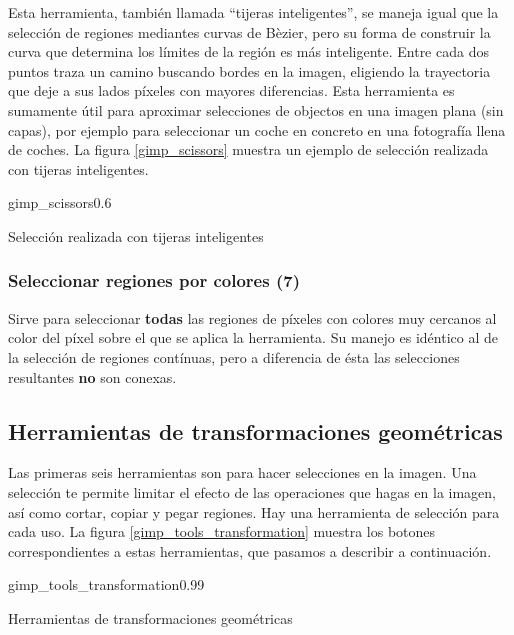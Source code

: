 Esta herramienta, también llamada  ``tijeras inteligentes'', se maneja
igual que la selección de regiones mediantes curvas de Bèzier, pero su
forma de construir la curva que  determina los límites de la región es
más inteligente. Entre cada dos  puntos \gimp traza un camino buscando
bordes en  la imagen, eligiendo  la trayectoria  que deje a  sus lados
píxeles con  mayores diferencias.  Esta herramienta es  sumamente útil
para  aproximar  selecciones de  objectos  en  una imagen  plana  (sin
capas),  por ejemplo  para seleccionar  un  coche en  concreto en  una
fotografía llena  de coches. La figura  \ref{gimp_scissors} muestra un
ejemplo de selección realizada con tijeras inteligentes.

\begin{figura}{gimp_scissors}{0.6}
\caption{Selección realizada con tijeras inteligentes}
\end{figura}

\subsubsection{Seleccionar regiones por colores (7)}

Sirve para seleccionar {\bf todas} las regiones de píxeles con colores
muy cercanos al color del píxel sobre el que se aplica la herramienta.
Su manejo es idéntico al de la selección de regiones contínuas, pero a
diferencia de ésta las selecciones resultantes {\bf no} son conexas.


\subsection{Herramientas de transformaciones geométricas}

Las  primeras   seis  herramientas  son  para   hacer  selecciones  en
la  imagen.  Una  selección  te  permite  limitar  el  efecto  de  las
operaciones que  hagas en la imagen,  así como cortar, copiar  y pegar
regiones. Hay  una herramienta de  selección para cada uso.  La figura
\ref{gimp_tools_transformation} muestra los botones correspondientes a
estas herramientas, que pasamos a describir a continuación.

\begin{figura}{gimp_tools_transformation}{0.99}
\caption{Herramientas de transformaciones geométricas}
\end{figura}


